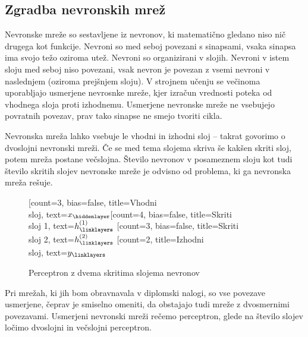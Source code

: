 \documentclass[mat1]{fmfdelo}
\begin{document}
\subsection{Zgradba nevronskih mrež}
Nevronske mreže so sestavljene iz nevronov, ki matematično gledano niso nič drugega kot funkcije. Nevroni so med seboj povezani s sinapsami, vsaka sinapsa ima svojo težo oziroma utež.
 Nevroni so organizirani v slojih. Nevroni v istem sloju med seboj niso povezani, vsak nevron je povezan z vsemi nevroni v naslednjem (oziroma prejšnjem sloju). V strojnem učenju se večinoma uporabljajo usmerjene nevrosnke mreže, kjer izračun vrednosti poteka od vhodnega sloja proti izhodnemu. Usmerjene nevronske mreže ne vsebujejo povratnih povezav, prav tako sinapse ne smejo tvoriti cikla.
 
 Nevronska mreža lahko vsebuje le vhodni in izhodni sloj -- takrat govorimo o dvoslojni nevronski mreži. Če se med tema slojema skriva še kakšen skriti sloj, potem mreža postane večslojna. Število nevronov v posameznem sloju kot tudi število skritih slojev nevronske mreže je odvisno od problema, ki ga nevronska mreža rešuje.
%
\begin{figure}
\centering
    \begin{neuralnetwork}[height=4]
        \newcommand{\x}[2]{$x_#2$}
        \newcommand{\y}[2]{$y_#2$}
        \newcommand{\hfirst}[2]{\small $h^{(1)}_#2$}
        \newcommand{\hsecond}[2]{\small $h^{(2)}_#2$}
        [count=3, bias=false, title=Vhodni\\sloj, text=\x]
        \hiddenlayer[count=4, bias=false, title=Skriti\\sloj 1, text=\hfirst] \linklayers
        \hiddenlayer[count=3, bias=false, title=Skriti\\sloj 2, text=\hsecond] \linklayers
        \outputlayer[count=2, title=Izhodni\\sloj, text=\y] \linklayers
    \end{neuralnetwork}
\label{mreza}
\caption{Perceptron z dvema skritima slojema nevronov}
\end{figure}
%
Pri mrežah, ki jih bom obravnavala v diplomski nalogi, so vse povezave usmerjene, čeprav je smiselno omeniti, da obstajajo tudi mreže z dvosmernimi povezavami. Usmerjeni nevronski mreži rečemo perceptron, glede na število slojev ločimo dvoslojni in večslojni perceptron.  
%
\end{document}
